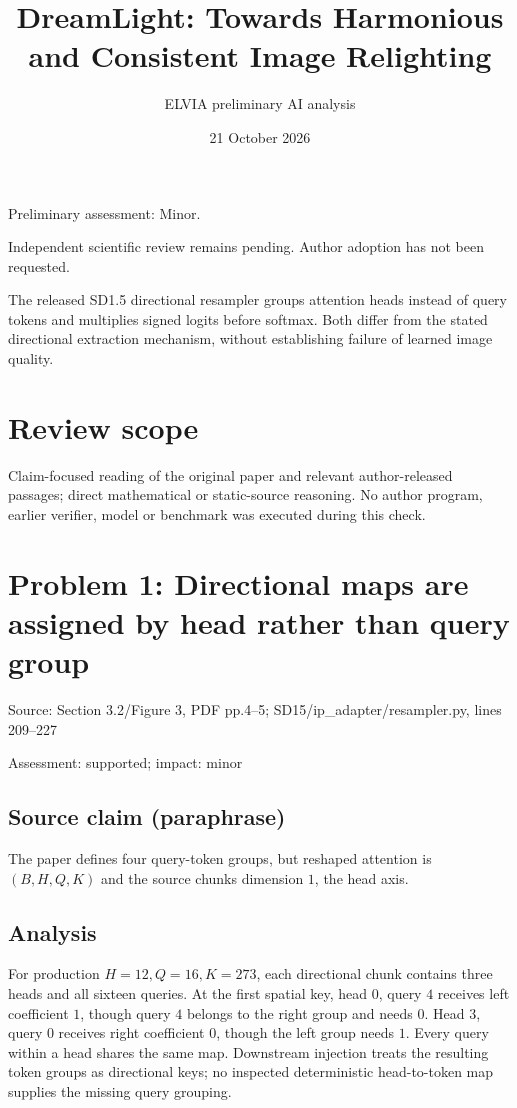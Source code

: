 \documentclass[11pt]{article}
\begin{document}
\title{DreamLight: Towards Harmonious and Consistent Image Relighting}

\author{ELVIA preliminary AI analysis}\date{21 October 2026}\maketitle

Preliminary assessment: Minor.\par

Independent scientific review remains pending. Author adoption has not been requested.

The released SD1.5 directional resampler groups attention heads instead of query tokens and multiplies signed logits before softmax. Both differ from the stated directional extraction mechanism, without establishing failure of learned image quality.

\section*{Review scope}

Claim-focused reading of the original paper and relevant author-released passages; direct mathematical or static-source reasoning. No author program, earlier verifier, model or benchmark was executed during this check.

\section*{Problem 1: Directional maps are assigned by head rather than query group}

Source: Section 3.2/Figure 3, PDF pp.4–5; SD15/ip\_adapter/resampler.py, lines 209–227

Assessment: supported; impact: minor

\subsection*{Source claim (paraphrase)}

The paper defines four query-token groups, but reshaped attention is \((B,H,Q,K)\) and the source chunks dimension \(1\), the head axis.

\subsection*{Analysis}

For production \(H=12,Q=16,K=273\), each directional chunk contains three heads and all sixteen queries. At the first spatial key, head \(0\), query \(4\) receives left coefficient \(1\), though query \(4\) belongs to the right group and needs \(0\). Head \(3\), query \(0\) receives right coefficient \(0\), though the left group needs \(1\). Every query within a head shares the same map. Downstream injection treats the resulting token groups as directional keys; no inspected deterministic head-to-token map supplies the missing query grouping.
\end{document}
